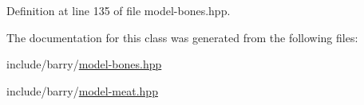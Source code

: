 Definition at line 135 of file model-\/bones.\+hpp.



The documentation for this class was generated from the following files\+:\begin{DoxyCompactItemize}
\item 
include/barry/\hyperlink{model-bones_8hpp}{model-\/bones.\+hpp}\item 
include/barry/\hyperlink{model-meat_8hpp}{model-\/meat.\+hpp}\end{DoxyCompactItemize}
